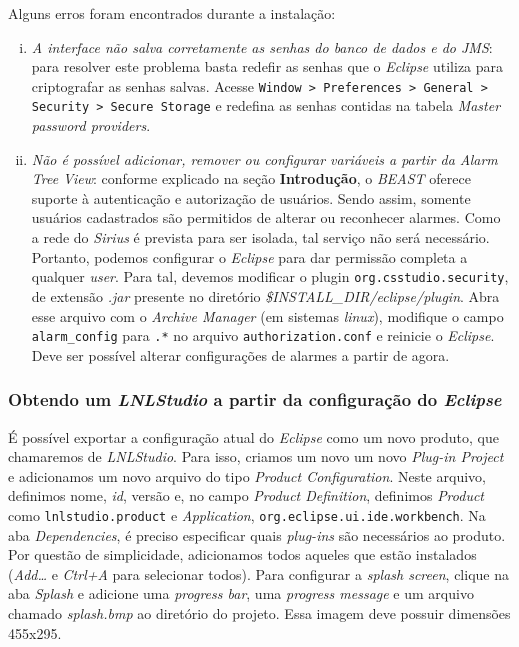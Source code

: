Alguns erros foram encontrados durante a instalação:

\begin{enumerate}[i.]
  \item \textit{A interface não salva corretamente as senhas do banco de dados e
  do JMS}: para resolver este problema basta redefir as senhas que o
  \textit{Eclipse} utiliza para criptografar as senhas salvas. Acesse
  \texttt{Window > Preferences > General > Security > Secure Storage} e redefina
  as senhas contidas na tabela \textit{Master password providers}.

  \item \textit{Não é possível adicionar, remover ou configurar variáveis a
  partir da Alarm Tree View}: conforme explicado na seção \textbf{Introdução}, o
  \textit{BEAST} oferece suporte à autenticação e autorização de usuários. Sendo
  assim, somente usuários cadastrados são permitidos de alterar ou reconhecer
  alarmes. Como a rede do \textit{Sirius} é prevista para ser isolada, tal
  serviço não será necessário. Portanto, podemos configurar o \textit{Eclipse}
  para dar permissão completa a qualquer \textit{user}. Para tal, devemos
  modificar o plugin \texttt{org.csstudio.security}, de extensão \textit{.jar}
  presente no diretório \textit {\$INSTALL\_DIR/eclipse/plugin}. Abra esse
  arquivo com o \textit{Archive Manager} (em sistemas \textit{linux}),
  modifique o campo \texttt{alarm\_config} para \texttt{.*} no arquivo
  \texttt{authorization.conf} e reinicie o \textit{Eclipse}. Deve ser possível
  alterar configurações de alarmes a partir de agora.
\end{enumerate}

\subsubsection {Obtendo um \textit{LNLStudio} a partir da configuração do
\textit{Eclipse}}

É possível exportar a configuração atual do \textit{Eclipse} como um novo
produto, que chamaremos de \textit{LNLStudio}. Para isso, criamos um novo um
novo \textit{Plug-in Project} e adicionamos um novo arquivo do tipo
\textit{Product Configuration}. Neste arquivo, definimos nome, \textit{id},
versão e, no campo \textit{Product Definition}, definimos \textit{Product} como
\texttt{lnlstudio.product} e \textit{Application},
\texttt{org.eclipse.ui.ide.workbench}. Na aba \textit{Dependencies}, é preciso
especificar quais \textit{plug-ins} são necessários ao produto. Por questão de
simplicidade, adicionamos todos aqueles que estão instalados
(\textit{Add\ldots} e \textit{Ctrl+A} para selecionar todos). Para configurar a
\textit{splash screen}, clique na aba \textit{Splash} e adicione uma
\textit{progress bar}, uma \textit{progress message} e um arquivo chamado
\textit{splash.bmp} ao diretório do projeto. Essa imagem deve possuir dimensões
455x295. 

